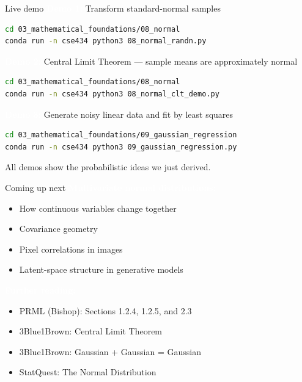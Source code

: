 \documentclass[aspectratio=169]{beamer}
\renewcommand{\textbf}[1]{\textcolor{white}{\bfseries #1}}
\begin{document}
\begin{frame}[fragile]{Live demo}
\textbf{Demo 1:} Transform standard-normal samples
\begin{lstlisting}[language=bash]
cd 03_mathematical_foundations/08_normal
conda run -n cse434 python3 08_normal_randn.py
\end{lstlisting}

\vspace{0.5em}
\textbf{Demo 2:} Central Limit Theorem — sample means are approximately normal
\begin{lstlisting}[language=bash]
cd 03_mathematical_foundations/08_normal
conda run -n cse434 python3 08_normal_clt_demo.py
\end{lstlisting}

\vspace{0.5em}
\textbf{Demo 3:} Generate noisy linear data and fit by least squares
\begin{lstlisting}[language=bash]
cd 03_mathematical_foundations/09_gaussian_regression
conda run -n cse434 python3 09_gaussian_regression.py
\end{lstlisting}

\vspace{0.5em}
All demos show the probabilistic ideas we just derived.
\end{frame}

\begin{frame}[c]{Coming up next}
\textbf{Multivariate normal distributions:}
\begin{itemize}
    \item How continuous variables change together
    \item Covariance geometry
    \item Pixel correlations in images
    \item Latent-space structure in generative models
\end{itemize}

\vspace{1em}
\textbf{Further reading:}
\begin{itemize}
    \item PRML (Bishop): Sections 1.2.4, 1.2.5, and 2.3
    \item 3Blue1Brown: Central Limit Theorem
    \item 3Blue1Brown: Gaussian + Gaussian = Gaussian
    \item StatQuest: The Normal Distribution
\end{itemize}
\end{frame}
\end{document}

